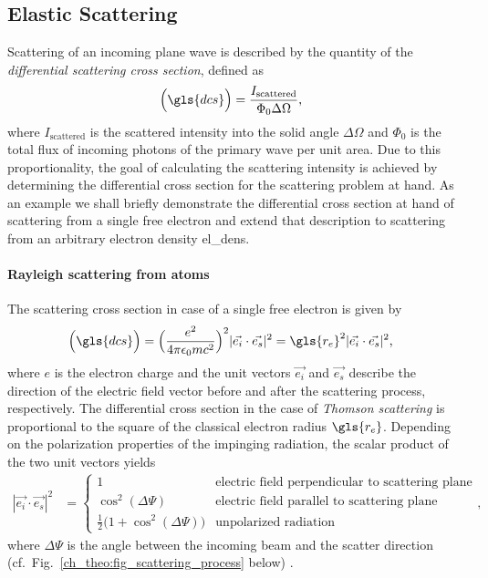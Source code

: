 \subsection{Elastic Scattering}
Scattering of an incoming plane wave is described by the quantity of the \emph{differential scattering cross section}, defined as
\begin{align}
\Big(\gls{dcs}\Big) &= \frac{I_\text{scattered}}{\Phi_0 \Delta \Omega}\text{,}
\end{align}
where $I_\text{scattered}$ is the scattered intensity into the solid angle $\Delta \Omega$ and $\Phi_0$ is the total flux of incoming photons of the primary wave per unit area. Due to this proportionality, the goal of calculating the scattering intensity is achieved by determining the differential cross section for the scattering problem at hand. As an example we shall briefly demonstrate the differential cross section at hand of scattering from a single free electron and extend that description to scattering from an arbitrary electron density \gls{el_dens}.

\paragraph{Rayleigh scattering from atoms}
The scattering cross section in case of a single free electron is given by
\begin{align}
 \Big(\gls{dcs}\Big) &= \Big(\frac{e^2}{4 \pi \epsilon_0 m c^2}\Big)^2 |\vec{e_i} \cdot \vec{e_s}|^2 = \gls{r_e}^2 |\vec{e_i} \cdot \vec{e_s}|^2 \text{,}
\end{align}
where $e$ is the electron charge and the unit vectors $\vec{e_i}$ and $\vec{e_s}$ describe the direction of the electric field vector before and after the scattering process, respectively. The differential cross section in the case of \emph{Thomson scattering} is proportional to the square of the classical electron radius $\gls{r_e}$. Depending on the polarization properties of the impinging radiation, the scalar product of the two unit vectors yields
\begin{align}
|\vec{e_i} \cdot \vec{e_s}|^2 &= \begin{cases}
    1 & \text{electric field perpendicular to scattering plane} \\
    \cos^2(\Delta \Psi) & \text{electric field parallel to scattering plane} \\
    \frac{1}{2}\big(1+\cos^2(\Delta \Psi)\big) & \text{unpolarized radiation}
\end{cases} \text{,}
\end{align}
where $\Delta \Psi$ is the angle between the incoming beam and the scatter direction (cf.~Fig.~\ref{ch_theo:fig_scattering_process} below) \cite{als-nielsen_x-rays_2011}.

